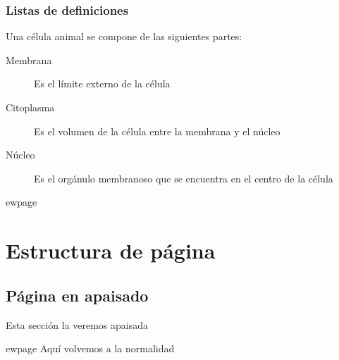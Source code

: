 \documentclass[11pt,twoside,a4paper]{article}
\begin{document}
\subsubsection{Listas de definiciones}
\label{sec:listasdefiniciones}

Una célula animal se compone de las siguientes partes:
\begin{description}
\item[Membrana] Es el límite externo de la célula
\item[Citoplasma] Es el volumen de la célula entre la membrana y el núcleo
\item[Núcleo] Es el orgánulo membranoso que se encuentra en el centro de la célula
\end{description}

ewpage{}
\section{Estructura de página}
\label{sec:estructurapagina}
\layout{}

\thispagestyle{empty}
\begin{landscape}
\thispagestyle{empty}
  \subsection{Página en apaisado}
  \label{sec:apaisado}
Esta sección la veremos apaisada
  
\end{landscape}

ewpage
Aquí volvemos a la normalidad
\end{document}
